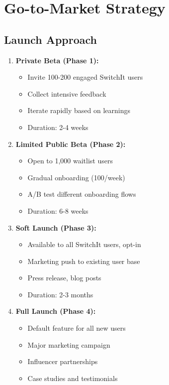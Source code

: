\documentclass[12pt,a4paper]{article}
\begin{document}
\section{Go-to-Market Strategy}

\subsection{Launch Approach}

\begin{enumerate}[leftmargin=*]
    \item \textbf{Private Beta (Phase 1):}
    \begin{itemize}
        \item Invite 100-200 engaged SwitchIt users
        \item Collect intensive feedback
        \item Iterate rapidly based on learnings
        \item Duration: 2-4 weeks
    \end{itemize}
    
    \item \textbf{Limited Public Beta (Phase 2):}
    \begin{itemize}
        \item Open to 1,000 waitlist users
        \item Gradual onboarding (100/week)
        \item A/B test different onboarding flows
        \item Duration: 6-8 weeks
    \end{itemize}
    
    \item \textbf{Soft Launch (Phase 3):}
    \begin{itemize}
        \item Available to all SwitchIt users, opt-in
        \item Marketing push to existing user base
        \item Press release, blog posts
        \item Duration: 2-3 months
    \end{itemize}
    
    \item \textbf{Full Launch (Phase 4):}
    \begin{itemize}
        \item Default feature for all new users
        \item Major marketing campaign
        \item Influencer partnerships
        \item Case studies and testimonials
    \end{itemize}
\end{enumerate}
\end{document}
